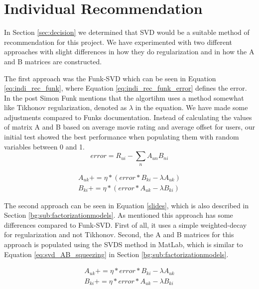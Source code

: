 \section{Individual Recommendation}\label{sec:individual_recommendation}
In Section \ref{sec:decision} we determined that SVD would be a suitable method of recommendation for this project. 
We have experimented with two different approaches with slight differences in how they do regularization and in how the A and B matrices are constructed.

The first approach was the Funk-SVD which can be seen in Equation \ref{eq:indi_rec_funk}, where Equation \ref{eq:indi_rec_funk_error} defines the error\cite{svdsimonfunk}. In the post Simon Funk mentions that the algortihm uses a method somewhat like Tikhonov regularization, denoted as $\lambda$ in the equation. We have made some adjustments compared to Funks documentation\cite{svdsimonfunk}. Instead of calculating the values of matrix A and B based on average movie rating and average offset for users, our initial test showed the best performance when populating them with random variables between 0 and 1.
\begin{equation}\label{eq:indi_rec_funk_error}
error = R_{ui} - \sum_n A_{un}B_{ni}
\end{equation}

\begin{equation}\label{eq:indi_rec_funk}
\begin{aligned}
A_{uk} += \eta * (error * B_{ki} - \lambda A_{uk}) \\
B_{ki} += \eta * (error * A_{uk} - \lambda B_{ki})
\end{aligned}
\end{equation}

The second approach can be seen in Equation \ref{slides}, which is also described in Section \ref{bg:sub:factorizationmodels}. As mentioned this approach has some differences compared to Funk-SVD. First of all, it uses a simple weighted-decay for regularization and not Tikhonov. Second, the A and B matrices for this approach is populated using the SVDS method in MatLab, which is similar to Equation \ref{eq:svd_AB_squeezing} in Section \ref{bg:sub:factorizationmodels}.

\begin{equation}\label{slides}
\begin{aligned}
A_{uk} += \eta * error *B_{ki} - \lambda A_{uk} \\
B_{ki} += \eta * error *A_{uk} - \lambda B_{ki} 
\end{aligned}
\end{equation}


